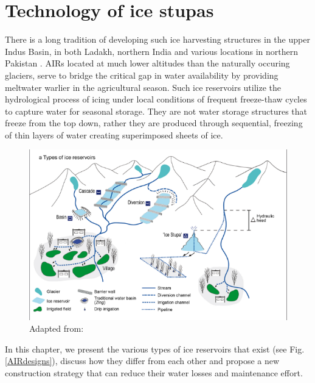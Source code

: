 \chapter{Technology of ice stupas}
\label{chap:tech}


There is a long tradition of developing such ice harvesting structures in the upper Indus Basin, in both Ladakh,
northern India \citep{labbalTraditionalOasesLadakh2000, nusserIrrigationDevelopmentUpper2012} and various
locations in northern Pakistan \citep{kreutzmannScarcityOpulenceWater2011}. AIRs located at much lower altitudes
than the naturally occuring glaciers, serve to bridge the critical gap in water availability by providing
meltwater warlier in the agricultural season. Such ice reservoirs utilize the hydrological process of icing
under local conditions of frequent freeze-thaw cycles to capture water for seasonal storage. They are not water
storage structures that freeze from the top down, rather they are produced through sequential, freezing of thin
layers of water creating superimposed sheets of ice.

\begin{figure}[htb]
\centering
\includegraphics[width=12cm]{figs/AIR_designs}
\caption{ Adapted from: \cite{nusserSociohydrologyArtificialGlaciers2019}}
\label{fig:AIRdesigns}
\end{figure}

In this chapter, we present the various types of ice reservoirs that exist (see Fig. \ref{AIRdesigns}), discuss
how they differ from each other and propose a new construction strategy that can reduce their water losses and
maintenance effort. 

